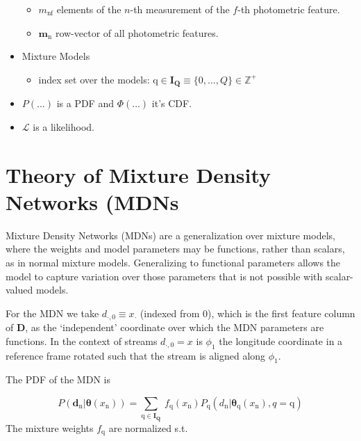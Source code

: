 \documentclass[twocolumn]{aastex631}
\newcommand{\mrm}[1]{\mathrm{#1}}
\newcommand{\mbs}[1]{\boldsymbol{#1}}
\newcommand{\mbf}[1]{\mathbf{#1}}
\newcommand{\mbb}[1]{\mathbb{#1}}
\newcommand{\mcal}[1]{\mathcal{#1}}
\newcommand{\nth}[1]{{#1}_{\mrm{n}}}
\newcommand{\qth}[1]{{#1}_{\mrm{q}}}
\newcommand{\pdf}{P}
\newcommand{\cdf}{\Phi}
\begin{document}
\begin{itemize}
\begin{itemize}
                \item $m_{\mrm{nf}}$ elements of the $n$-th measurement of the $f$-th photometric feature.
                \item $\nth{\mbs{m}}$ row-vector of all photometric features.
            \end{itemize}
        \item Mixture Models
            \begin{itemize}
                \item index set over the models: $\mrm{q} \in \mbs{I_Q} \equiv \{0, ..., Q \} \in \mbb{Z^+}$ 
            \end{itemize}
        \item $\pdf(...)$ is a PDF and $\cdf(...)$ it's CDF.
        \item $\mcal{L}$ is a likelihood.
    \end{itemize}



\section{Theory of Mixture Density Networks (MDNs} \label{app:theory_of_mixture_density_networks}

    Mixture Density Networks (MDNs) are a generalization over mixture models, where the weights and model parameters may be functions, rather than scalars, as in normal mixture models. Generalizing to functional parameters allows the model to capture variation over those parameters that is not possible with scalar-valued models.
    
    For the MDN we take $d_{\cdot, 0} \equiv x_{\cdot}$ (indexed from 0), which is the first feature column of $\mbf{D}$, as the `independent' coordinate over which the MDN parameters are functions. In the context of streams $d_{\cdot, 0} = x$ is $\phi_1$ the longitude coordinate in a reference frame rotated such that the stream is aligned along $\phi_1$.

    The PDF of the MDN is

    \begin{equation} \label{eq:general_mixture_network}
        \pdf(\nth{\mbs{d}} | \mbs{\theta}(\nth{x}))
        = \sum_{\mrm{q} \in \mbs{I_Q}} \ \qth{f}(\nth{x}) \qth{P}(\nth{d}|\qth{\mbs{\theta}}(\nth{x}),q\!=\!\mrm{q})
    \end{equation}
    The mixture weights $\qth{f}$ are normalized s.t.
\end{document}

